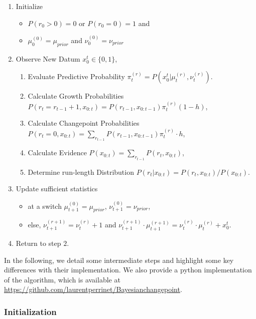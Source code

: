 \documentclass[10pt,letterpaper]{article}
\newcommand{\eqa}[1]{\begin{align}#1\end{align}}
\begin{document}
\begin{enumerate}
	\item Initialize
	\begin{itemize}
		\item    $P(r_0>0)= 0$ or $P(r_0=0)=1$ and
		\item    $\mu^{(0)}_0 = \mu_{prior}$ and $\nu^{(0)}_0 = \nu_{prior}$
	\end{itemize}

	\item     Observe New Datum $x_0^t \in \{ 0, 1 \}$,

	\begin{enumerate}

		\item    Evaluate Predictive Probability $\pi^{(r)}_{t} = P(x_0^t |\mu^{(r)}_t,\nu^{(r)}_t)$.
	    \item    Calculate Growth Probabilities $P(r_t=r_{t-1}+1, x_{0:t}) = P(r_{t-1}, x_{0:t-1}) \pi^{(r)}_t (1-h)$,
	    \item    Calculate Changepoint Probabilities $P(r_t=0, x_{0:t})= \sum_{r_{t-1}} P(r_{t-1}, x_{0:t-1}) \pi^{(r)}_t \cdot h$,
	    \item    Calculate Evidence $P(x_{0:t}) = \sum_{r_{t-1}} P (r_t, x_{0:t})$,
	    \item    Determine run-length Distribution $P (r_t | x_{0:t}) = P (r_t, x_{0:t})/P (x_{0:t}) $.
	\end{enumerate}

	\item     Update sufficient statistics
		\begin{itemize}
			\item  at a switch  $\mu^{(0)}_{t+1} = \mu_{prior}$, $\nu^{(0)}_{t+1} = \nu_{prior}$,
			\item  else, $\nu^{(r+1)}_{t+1} = \nu^{(r)}_{t} + 1$ and $\nu^{(r+1)}_{t+1} \cdot \mu^{(r+1)}_{t+1} = \nu^{(r)}_{t} \cdot \mu^{(r)}_{t} + x_0^t$.
		\end{itemize}
	\item     Return to step $2$.
\end{enumerate}


In the following, we  detail some intermediate steps and highlight some key differences with their implementation. We also provide a python implementation of the algorithm, which is available at \url{https://github.com/laurentperrinet/Bayesianchangepoint}.

\subsubsection{Initialization}
\end{document}
